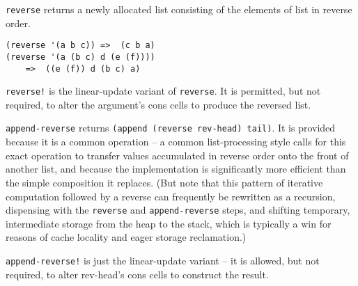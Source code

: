 \begin{entry}{%
  }

  \texttt{reverse} returns a newly allocated list consisting of the
  elements of list in reverse order.

\begin{verbatim}
(reverse '(a b c)) =>  (c b a)
(reverse '(a (b c) d (e (f))))
    =>  ((e (f)) d (b c) a)
\end{verbatim}

  \texttt{reverse!} is the linear-update variant of
  \texttt{reverse}. It is permitted, but not required, to alter the
  argument's cons cells to produce the reversed list.
\end{entry}

\begin{entry}{%
  }

  \texttt{append-reverse} returns \texttt{(append\ (reverse\
    rev-head)\ tail)}. It is provided because it is a common operation
  -- a common list-processing style calls for this exact operation to
  transfer values accumulated in reverse order onto the front of
  another list, and because the implementation is significantly more
  efficient than the simple composition it replaces. (But note that
  this pattern of iterative computation followed by a reverse can
  frequently be rewritten as a recursion, dispensing with the
  \texttt{reverse} and \texttt{append-reverse} steps, and shifting
  temporary, intermediate storage from the heap to the stack, which is
  typically a win for reasons of cache locality and eager storage
  reclamation.)

  \texttt{append-reverse!} is just the linear-update variant -- it is
  allowed, but not required, to alter rev-head's cons cells to
  construct the result.
\end{entry}

